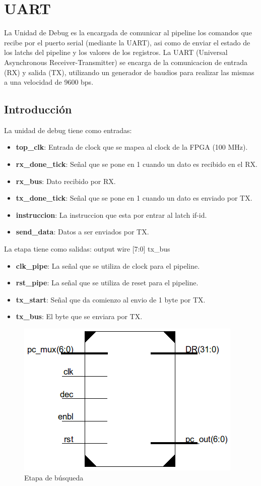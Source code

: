 \section{UART}
La Unidad de Debug es la encargada de comunicar al pipeline los comandos que recibe por el puerto serial (mediante la UART), asi como de enviar el estado de los latchs del pipeline y los valores de los registros. La UART (Universal Asynchronous Receiver-Transmitter) se encarga de la comunicacion de entrada (RX) y salida (TX), utilizando un generador de baudios para realizar las mismas a una velocidad de 9600 bps.

\subsection{Introducción}
La unidad de debug tiene como entradas:

\begin{itemize}
  \item \textbf{top_clk}: Entrada de clock que se mapea al clock de la FPGA (100 MHz). 
  \item \textbf{rx_done_tick}: Señal que se pone en 1 cuando un dato es recibido en el RX.
  \item \textbf{rx_bus}: Dato recibido por RX.
  \item \textbf{tx_done_tick}: Señal que se pone en 1 cuando un dato es enviado por TX.
  \item \textbf{instruccion}: La instruccion que esta por entrar al latch if-id.
  \item \textbf{send_data}: Datos a ser enviados por TX.
\end{itemize} 

La etapa tiene como salidas:
	 output wire [7:0] tx_bus
\begin{itemize}
	\item \textbf{clk_pipe}: La señal que se utiliza de clock para el pipeline. 
	\item \textbf{rst_pipe}: La señal que se utiliza de reset para el pipeline.
	\item \textbf{tx_start}: Señal que da comienzo al envio de 1 byte por TX. 
	\item \textbf{tx_bus}: El byte que se enviara por TX.
\end{itemize} 

\begin{figure}[H]
\centering
\includegraphics[scale=0.35]{Capitulo01/fetchstage}
\caption{Etapa de búsqueda}
\label{fig:fetch}
\end{figure}

